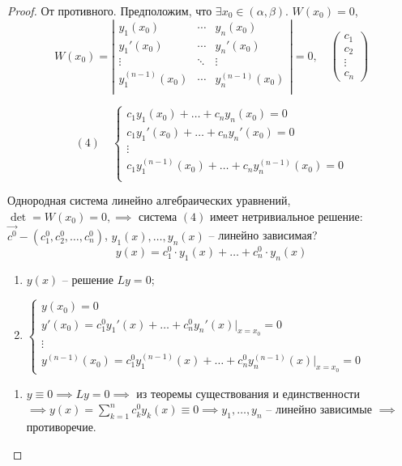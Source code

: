 \documentclass{report}
\theoremstyle{definition}
\begin{document}
\begin{proof}
    От противного. Предположим, что $\exists x_0 \in (\alpha,\beta)$. $W(x_0) = 0$,
    \begin{equation*}
        W(x_0) = \left|\begin{array}{ccc}
            y_1(x_0) & \cdots & y_n(x_0) \\
            y_1'(x_0) & \cdots & y_n'(x_0) \\
            \vdots & \ddots & \vdots \\
            y_1^{(n-1)}(x_0) & \cdots & y_n^{(n-1)}(x_0) \\
        \end{array}\right| = 0, \quad \left(\begin{array}{c}
            c_1 \\
            c_2 \\
            \vdots \\
            c_n
        \end{array}\right)
    \end{equation*}

    \begin{equation*}
        (4) \quad \left\{\begin{array}{l}
            c_1y_1(x_0) + \ldots + c_ny_n(x_0) = 0 \\
            c_1y_1'(x_0) + \ldots + c_ny_n'(x_0) = 0 \\
            \vdots \\
            c_1y_1^{(n-1)}(x_0) + \ldots + c_ny_n^{(n-1)}(x_0) = 0 \\
        \end{array}\right.
    \end{equation*}

    Однородная система линейно алгебраических уравнений, $\det = W(x_0) = 0, \implies$ система $(4)$ имеет нетривиальное решение: $\overrightarrow{c^0} - (c_1^0,c_2^0,\ldots,c_n^0)$, $y_1(x),\ldots,y_n(x)$ -- линейно зависимая?
    \begin{equation*}
        y(x) = c_1^0 \cdot y_1(x) + \ldots + c_n^0 \cdot y_n(x)
    \end{equation*}
    \begin{enumerate}
        \item $y(x)$ -- решение $Ly = 0$;
        \item $\left\{\begin{array}{l}
            y(x_0) = 0 \\
            y'(x_0) = c_1^0 y_1'(x) + \ldots + c_n^0y_n'(x)\bigg|_{x=x_0} = 0 \\
            \vdots \\
            y^{(n-1)}(x_0) = c_1^0 y_1^{(n-1)}(x) + \ldots + c_n^0y_n^{(n-1)}(x)\bigg|_{x=x_0} = 0
        \end{array}\right.$
    \end{enumerate}
    \begin{enumerate}
        \item $y\equiv0 \implies Ly = 0 \implies$ из теоремы существования и единственности $\implies y(x) = \sum_{k=1}^{n}c_k^0 y_k(x) \equiv 0 \implies y_1,\ldots,y_n$ -- линейно зависимые $\implies$ противоречие.
    \end{enumerate}
\end{proof}
\end{document}
